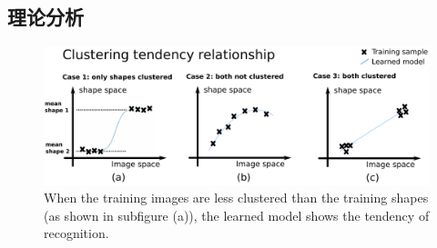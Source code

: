 \documentclass[bachelor, nocolorlinks, printoneside]{seuthesis} %
\begin{document}
\begin{Main}
\section{理论分析}
\begin{figure}
    \centering
    \includegraphics[width=.95\textwidth]{figs/drawing-1.pdf}
    \caption{\small When the training images are less clustered than the training shapes (as shown in subfigure (a)), the learned model shows the tendency of recognition.}
    \label{fig:clustering_tendency}
\end{figure}

\end{Main}
\end{document}
